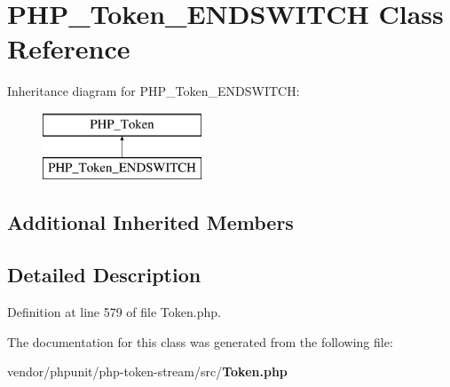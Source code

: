 \section{P\+H\+P\+\_\+\+Token\+\_\+\+E\+N\+D\+S\+W\+I\+T\+C\+H Class Reference}
\label{class_p_h_p___token___e_n_d_s_w_i_t_c_h}
Inheritance diagram for P\+H\+P\+\_\+\+Token\+\_\+\+E\+N\+D\+S\+W\+I\+T\+C\+H\+:\begin{figure}[H]
\begin{center}
\leavevmode
\includegraphics[height=2.000000cm]{class_p_h_p___token___e_n_d_s_w_i_t_c_h}
\end{center}
\end{figure}
\subsection*{Additional Inherited Members}


\subsection{Detailed Description}


Definition at line 579 of file Token.\+php.



The documentation for this class was generated from the following file\+:\begin{DoxyCompactItemize}
\item 
vendor/phpunit/php-\/token-\/stream/src/{\bf Token.\+php}\end{DoxyCompactItemize}
